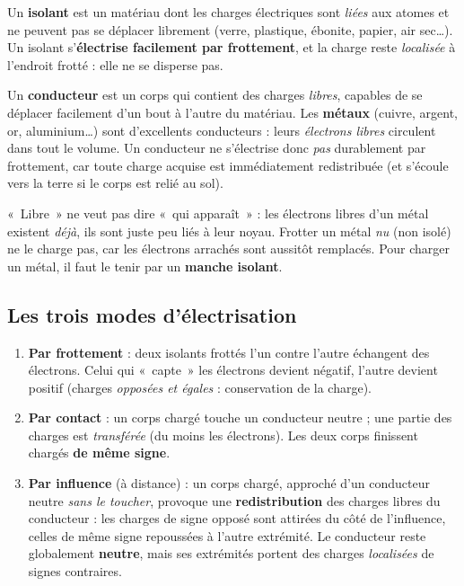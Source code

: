\documentclass[11pt,a4paper]{article}
\begin{document}
\begin{definition}[isolant]
Un \textbf{isolant} est un matériau dont les charges électriques sont \emph{liées} aux atomes et ne
peuvent pas se déplacer librement (verre, plastique, ébonite, papier, air sec\dots). Un isolant
s'\textbf{électrise facilement par frottement}, et la charge reste \emph{localisée} à l'endroit
frotté : elle ne se disperse pas.
\end{definition}

\begin{definition}[conducteur]
Un \textbf{conducteur} est un corps qui contient des charges \emph{libres}, capables de se déplacer
facilement d'un bout à l'autre du matériau. Les \textbf{métaux} (cuivre, argent, or, aluminium\dots)
sont d'excellents conducteurs : leurs \emph{électrons libres} circulent dans tout le volume. Un
conducteur ne s'électrise donc \emph{pas} durablement par frottement, car toute charge acquise est
immédiatement redistribuée (et s'écoule vers la terre si le corps est relié au sol).
\end{definition}

\begin{attention}
«~Libre~» ne veut pas dire «~qui apparaît~» : les électrons libres d'un métal existent
\emph{déjà}, ils sont juste peu liés à leur noyau. Frotter un métal \emph{nu} (non isolé) ne le
charge pas, car les électrons arrachés sont aussitôt remplacés. Pour charger un métal, il faut le
tenir par un \textbf{manche isolant}.
\end{attention}

\subsection{Les trois modes d'électrisation}

\begin{theoreme}
\leavevmode
\begin{enumerate}[leftmargin=1.8em,topsep=2pt,itemsep=2pt]
  \item \textbf{Par frottement} : deux isolants frottés l'un contre l'autre échangent des électrons.
        Celui qui «~capte~» les électrons devient négatif, l'autre devient positif (charges
        \emph{opposées et égales} : conservation de la charge).
  \item \textbf{Par contact} : un corps chargé touche un conducteur neutre ; une partie des charges
        est \emph{transférée} (du moins les électrons). Les deux corps finissent chargés
        \textbf{de même signe}.
  \item \textbf{Par influence} (à distance) : un corps chargé, approché d'un conducteur neutre
        \emph{sans le toucher}, provoque une \textbf{redistribution} des charges libres du
        conducteur : les charges de signe opposé sont attirées du côté de l'influence, celles de
        même signe repoussées à l'autre extrémité. Le conducteur reste globalement \textbf{neutre},
        mais ses extrémités portent des charges \emph{localisées} de signes contraires.
\end{enumerate}
\end{theoreme}
\end{document}
